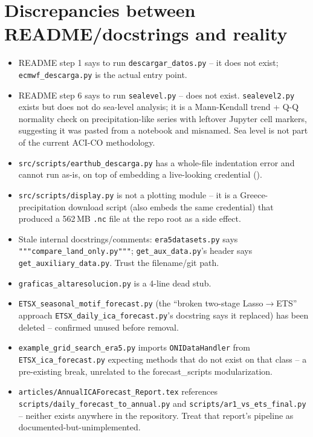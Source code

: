 \documentclass[11pt]{article}
\begin{document}
\section{Discrepancies between README/docstrings and reality}
\label{sec:discrepancies}

\begin{itemize}[leftmargin=*]
\item README step 1 says to run \texttt{descargar\_datos.py} -- it does not
  exist; \texttt{ecmwf\_descarga.py} is the actual entry point.
\item README step 6 says to run \texttt{sealevel.py} -- does not exist.
  \texttt{sealevel2.py} exists but does not do sea-level analysis; it is a
  Mann-Kendall trend + Q-Q normality check on precipitation-like series with
  leftover Jupyter cell markers, suggesting it was pasted from a notebook
  and misnamed. Sea level is not part of the current ACI-CO methodology.
\item \texttt{src/scripts/earthub\_descarga.py} has a whole-file
  indentation error and cannot run as-is, on top of embedding a live-looking
  credential ().
\item \texttt{src/scripts/display.py} is not a plotting module -- it is a
  Greece-precipitation download script (also embeds the same credential)
  that produced a 562\,MB \texttt{.nc} file at the repo root as a side
  effect.
\item Stale internal docstrings/comments: \texttt{era5datasets.py} says
  \texttt{"""compare\_land\_only.py"""}; \texttt{get\_aux\_data.py}'s header
  says \texttt{get\_auxiliary\_data.py}. Trust the filename/git path.
\item \texttt{graficas\_altaresolucion.py} is a 4-line dead stub.
\item \texttt{ETSX\_seasonal\_motif\_forecast.py} (the ``broken two-stage
  Lasso$\to$ETS'' approach \texttt{ETSX\_daily\_ica\_forecast.py}'s
  docstring says it replaced) has been deleted -- confirmed unused before
  removal.
\item \texttt{example\_grid\_search\_era5.py} imports \texttt{ONIDataHandler}
  from \texttt{ETSX\_ica\_forecast.py} expecting methods that do not exist
  on that class -- a pre-existing break, unrelated to the forecast\_scripts
  modularization.
\item \texttt{articles/AnnualICAForecast\_Report.tex} references
  \texttt{scripts/daily\_forecast\_to\_annual.py} and
  \texttt{scripts/ar1\_vs\_ets\_final.py} -- neither exists anywhere in the
  repository. Treat that report's pipeline as documented-but-unimplemented.
\end{itemize}
\end{document}
